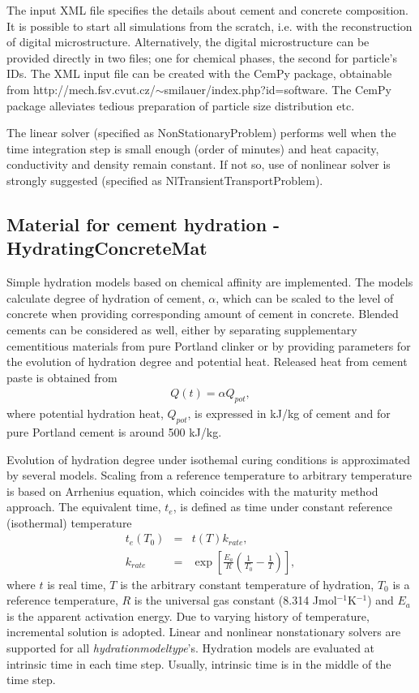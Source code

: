 \documentclass[a4paper]{article}
\newcommand{\param}[1]{{\it #1}}
\begin{document}
The input XML file specifies the details about cement and concrete composition.
It is possible to start all simulations from the scratch, i.e. with the
reconstruction of digital microstructure. Alternatively, the digital
microstructure can be provided directly in two files; one for chemical phases,
the second for particle's IDs. The XML input file can be created with the CemPy
package, obtainable from
http://mech.fsv.cvut.cz/$\sim$smilauer/index.php?id=software. The CemPy package
alleviates tedious preparation of particle size distribution etc.

The linear solver (specified as NonStationaryProblem) performs well when the
time integration step is small enough (order of minutes) and heat capacity,
conductivity and density remain constant. If not so, use of nonlinear solver is
strongly suggested (specified as NlTransientTransportProblem).

\clearpage

\subsection{Material for cement hydration - HydratingConcreteMat}
\label{Affinity1}
Simple hydration models based on chemical affinity are implemented. The models calculate degree of hydration of cement, $\alpha$, which can be scaled to the level of concrete when providing corresponding amount of cement in concrete. Blended cements can be considered as well, either by separating supplementary cementitious materials from pure Portland clinker or by providing parameters for the evolution of hydration degree and potential heat. Released heat from cement paste is obtained from
\begin{eqnarray}
Q(t) = \alpha Q_{pot},
\end{eqnarray}
where potential hydration heat, $Q_{pot}$, is expressed in kJ/kg of cement and for pure Portland cement is around 500 kJ/kg.

Evolution of hydration degree under isothemal curing conditions is approximated by several models. Scaling from a reference temperature to arbitrary temperature is based on Arrhenius equation, which coincides with the maturity method approach. The equivalent time, $t_e$, is defined as time under constant reference (isothermal) temperature
\begin{eqnarray}
t_e(T_0)&=&t(T) k_{rate},\\
k_{rate}&=&\exp\left[\frac{E_a}{R}\left(\frac{1}{T_0}-\frac{1}{T}\right)\right],
\end{eqnarray}
where $t$ is real time, $T$ is the arbitrary constant temperature of hydration, $T_0$ is a reference temperature, $R$ is the universal gas constant (8.314 Jmol$^{-1}$K$^{-1}$) and $E_a$ is the apparent activation energy. Due to varying history of temperature, incremental solution is adopted. Linear and nonlinear nonstationary solvers are supported for all \param{hydrationmodeltype}'s. Hydration models are evaluated at intrinsic time in each time step. Usually, intrinsic time is in the middle of the time step.
\end{document}

